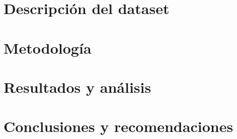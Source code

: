 \documentclass[Royal,times,sageh]{sagej}
\begin{document}
\section{Descripción del dataset}\label{descripciuxf3n-del-dataset}

\section{Metodología}\label{metodologuxeda}

\section{Resultados y análisis}\label{resultados-y-anuxe1lisis}

\section{Conclusiones y
recomendaciones}\label{conclusiones-y-recomendaciones}



\end{document}
